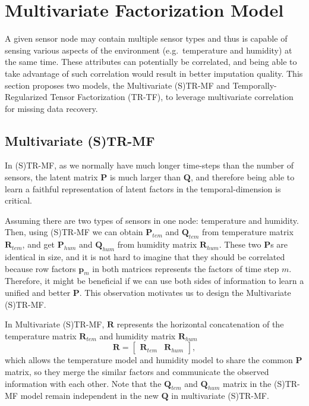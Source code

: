 
\section{Multivariate Factorization Model} \label{sec:tf}
A given sensor node may contain multiple sensor types and thus is capable of sensing various aspects of the environment (e.g.\ temperature and humidity) at the same time.
These attributes can potentially be correlated, and being able to take advantage of such correlation would result in better imputation quality.
This section proposes two models, the Multivariate (S)TR-MF and Temporally-Regularized Tensor Factorization (TR-TF), to leverage multivariate correlation for missing data recovery.

\subsection{Multivariate (S)TR-MF} %
In (S)TR-MF, as we normally have much longer time-steps than the number of sensors, the latent matrix $\mathbf{P}$ is much larger than $\mathbf{Q}$, and therefore being able to learn a faithful representation of latent factors in the temporal-dimension is critical. 

Assuming there are two types of sensors in one node: temperature and humidity. Then, using (S)TR-MF we can obtain $\mathbf{P}_{tem}$ and $\mathbf{Q}_{tem}$ from temperature matrix $\mathbf{R}_{tem}$, and get $\mathbf{P}_{hum}$ and $\mathbf{Q}_{hum}$ from humidity matrix $\mathbf{R}_{hum}$. These two $\mathbf{P}$s are identical in size, and it is not hard to imagine that they should be correlated because row factors $\mathbf{p}_m$ in both matrices represents the factors of time step $m$. Therefore, it might be beneficial if we can use both sides of information to learn a unified and better $\mathbf{P}$.
This observation motivates us to design the Multivariate (S)TR-MF.

In Multivariate (S)TR-MF, $\mathbf{R}$ represents the horizontal concatenation of the temperature matrix $\mathbf{R}_{tem}$ and humidity matrix $\mathbf{R}_{hum}$
\begin{equation*} \mathbf{R} = \begin{bmatrix}\mathbf{R}_{tem} & \mathbf{R}_{hum} \end{bmatrix}, \end{equation*}
which allows the temperature model and humidity model to share the common $\mathbf{P}$ matrix, so they merge the similar factors and communicate the observed information with each other. Note that the $\mathbf{Q}_{tem}$ and $\mathbf{Q}_{hum}$ matrix in the (S)TR-MF model remain independent in the new $\mathbf{Q}$ in multivariate (S)TR-MF.

